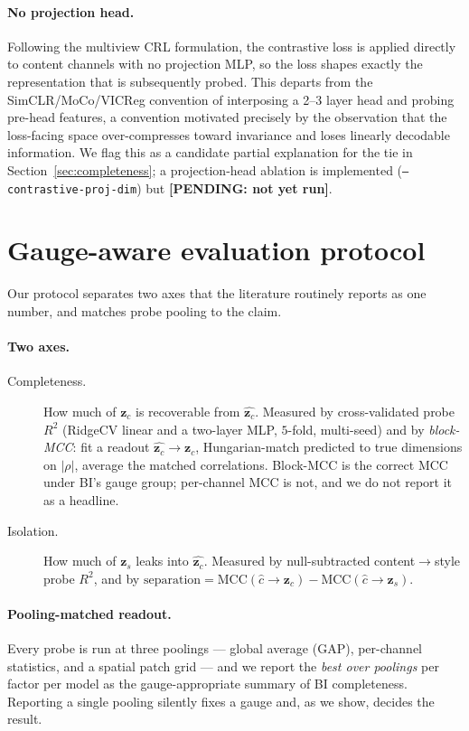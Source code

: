 \documentclass[11pt]{article}
\newcommand{\pending}[1]{{\color{red}\textbf{[PENDING: #1]}}}
\newcommand{\zc}{\mathbf{z}_c}
\newcommand{\zs}{\mathbf{z}_s}
\begin{document}
\paragraph{No projection head.} Following the multiview CRL formulation, the
contrastive loss is applied directly to content channels with no projection MLP,
so the loss shapes exactly the representation that is subsequently probed. This
departs from the SimCLR/MoCo/VICReg convention of interposing a
2--3 layer head and probing pre-head features, a convention motivated precisely
by the observation that the loss-facing space over-compresses toward invariance
and loses linearly decodable information. We flag this as a candidate partial
explanation for the tie in Section~\ref{sec:completeness}; a projection-head
ablation is implemented (\texttt{--contrastive-proj-dim}) but
\pending{not yet run}.

\section{Gauge-aware evaluation protocol}
\label{sec:protocol}

Our protocol separates two axes that the literature routinely reports as one
number, and matches probe pooling to the claim.

\paragraph{Two axes.}
\begin{description}
\item[Completeness.] How much of $\zc$ is recoverable from $\hat{\zc}$. Measured
by cross-validated probe $R^2$ (RidgeCV linear and a two-layer MLP, $5$-fold,
multi-seed) and by \emph{block-MCC}: fit a readout $\hat{\zc} \to \zc$,
Hungarian-match predicted to true dimensions on $|\rho|$, average the matched
correlations. Block-MCC is the correct MCC under BI's gauge group; per-channel
MCC is not, and we do not report it as a headline.
\item[Isolation.] How much of $\zs$ leaks into $\hat{\zc}$. Measured by
null-subtracted content$\to$style probe $R^2$, and by
$\mathrm{separation} = \mathrm{MCC}(\hat{c}\to\zc) - \mathrm{MCC}(\hat{c}\to\zs)$.
\end{description}

\paragraph{Pooling-matched readout.} Every probe is run at three poolings ---
global average (GAP), per-channel statistics, and a spatial patch grid --- and
we report the \emph{best over poolings} per factor per model as the
gauge-appropriate summary of BI completeness. Reporting a single pooling
silently fixes a gauge and, as we show, decides the result.
\end{document}
